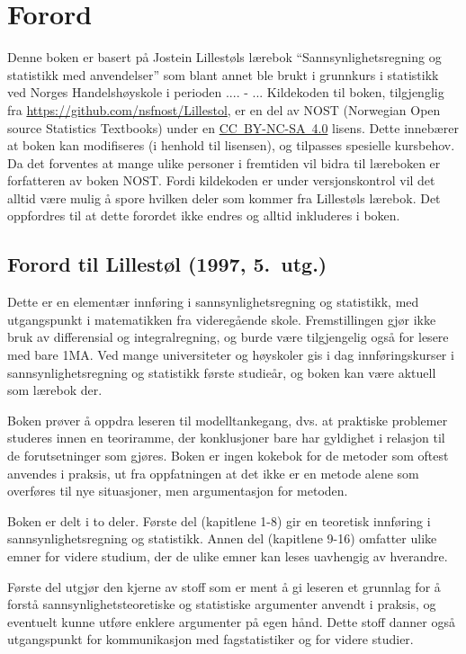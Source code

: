 
\chapter*{Forord}

Denne boken er basert på Jostein Lillestøls lærebok 
``Sannsynlighetsregning og statistikk med anvendelser'' som blant annet ble
brukt i grunnkurs i statistikk ved Norges Handelshøyskole i perioden .... - ...
Kildekoden til boken, tilgjenglig fra \url{https://github.com/nsfnost/Lillestol}, er en del av NOST (Norwegian Open source Statistics Textbooks)
under en \href{https://creativecommons.org/licenses/by-nc-sa/4.0/}{CC~BY-NC-SA~4.0} lisens. Dette innebærer
at boken kan modifiseres (i henhold til lisensen), og tilpasses spesielle kursbehov.
Da det forventes at mange ulike personer i fremtiden vil bidra til læreboken
er forfatteren av boken NOST. Fordi kildekoden er under versjonskontrol vil
det alltid være mulig å spore hvilken deler som kommer fra Lillestøls lærebok.
Det oppfordres til at dette forordet ikke endres og alltid inkluderes i boken.

\section*{Forord til Lillestøl (1997, 5.~utg.)}
Dette er en elementær innføring i sannsynlighetsregning og
statistikk, med utgangspunkt i matematikken fra videregående skole.
Fremstillingen gjør ikke bruk av differensial og integralregning,
og burde være tilgjengelig også for lesere med bare 1MA.
Ved mange universiteter og høyskoler gis i dag innføringskurser i
sannsynlighetsregning og statistikk første studieår, og boken kan
være aktuell som lærebok der.

Boken prøver å oppdra leseren til modelltankegang, dvs. at
praktiske problemer studeres innen en teoriramme, der konklusjoner
bare har gyldighet i relasjon til de forutsetninger som gjøres.
Boken er ingen kokebok for de metoder som oftest anvendes i praksis,
ut fra oppfatningen at det ikke er en metode alene som overføres til nye
situasjoner, men argumentasjon for metoden.

Boken er delt i to deler.  Første del (kapitlene 1-8) gir en teoretisk
innføring i sannsynlighetsregning og statistikk.  Annen del (kapitlene
9-16) omfatter ulike emner for videre studium, der de ulike emner kan leses
uavhengig av hverandre.

Første del utgjør den kjerne av stoff som er ment å gi leseren
et grunnlag for å forstå sannsynlighetsteoretiske og statistiske
argumenter anvendt i praksis, og eventuelt kunne utføre enklere 
argumenter på egen hånd.  Dette stoff danner også utgangspunkt 
for kommunikasjon med fagstatistiker og for videre studier.

